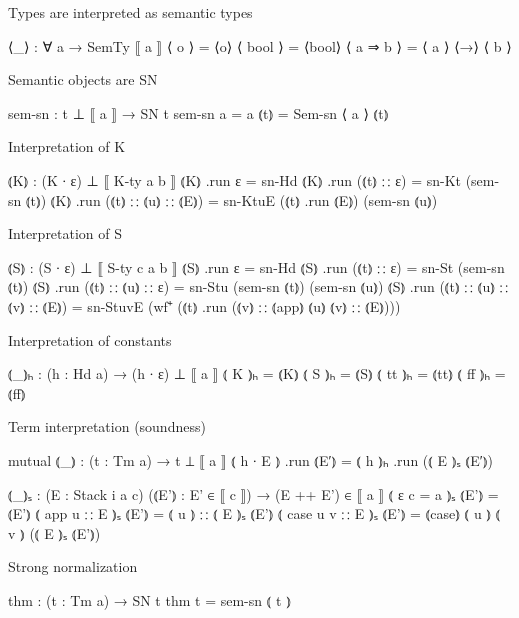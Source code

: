 Types are interpreted as semantic types

\begin{code}
⟨_⟩ : ∀ a → SemTy ⟦ a ⟧
⟨ o     ⟩  = ⟨o⟩
⟨ bool  ⟩  = ⟨bool⟩
⟨ a ⇒ b ⟩  = ⟨ a ⟩ ⟨→⟩ ⟨ b ⟩
\end{code}

Semantic objects are SN

\begin{code}
sem-sn : t ⊥ ⟦ a ⟧ → SN t
sem-sn {a = a} ⦅t⦆ = Sem-sn ⟨ a ⟩ ⦅t⦆
\end{code}


Interpretation of K

\begin{code}
⦅K⦆ : (K ∙ ε) ⊥ ⟦ K-ty a b ⟧
⦅K⦆ .run ε                  = sn-Hd
⦅K⦆ .run (⦅t⦆ ∷ ε)          = sn-Kt (sem-sn ⦅t⦆)
⦅K⦆ .run (⦅t⦆ ∷ ⦅u⦆ ∷ ⦅E⦆)  = sn-KtuE (⦅t⦆ .run ⦅E⦆) (sem-sn ⦅u⦆)
\end{code}


Interpretation of S

\begin{code}
⦅S⦆ : (S ∙ ε) ⊥ ⟦ S-ty c a b ⟧
⦅S⦆ .run ε                        = sn-Hd
⦅S⦆ .run (⦅t⦆ ∷ ε)                = sn-St (sem-sn ⦅t⦆)
⦅S⦆ .run (⦅t⦆ ∷ ⦅u⦆ ∷ ε)          = sn-Stu (sem-sn ⦅t⦆) (sem-sn ⦅u⦆)
⦅S⦆ .run (⦅t⦆ ∷ ⦅u⦆ ∷ ⦅v⦆ ∷ ⦅E⦆)  = sn-StuvE (wf⁺ (⦅t⦆ .run (⦅v⦆ ∷ ⦅app⦆ ⦅u⦆ ⦅v⦆ ∷ ⦅E⦆)))
\end{code}


Interpretation of constants

\begin{code}
⦅_⦆ₕ : (h : Hd a) → (h ∙ ε) ⊥ ⟦ a ⟧
⦅ K ⦆ₕ   = ⦅K⦆
⦅ S ⦆ₕ   = ⦅S⦆
⦅ tt ⦆ₕ  = ⦅tt⦆
⦅ ff ⦆ₕ  = ⦅ff⦆
\end{code}

Term interpretation (soundness)

\begin{code}
mutual
  ⦅_⦆ : (t : Tm a) → t ⊥ ⟦ a ⟧
  ⦅ h ∙ E ⦆ .run ⦅E′⦆ = ⦅ h ⦆ₕ .run (⦅ E ⦆ₛ ⦅E′⦆)

  ⦅_⦆ₛ : (E : Stack i a c) (⦅E'⦆ : E' ∈ ⟦ c ⟧) → (E ++ E') ∈ ⟦ a ⟧
  ⦅ ε {c = a}    ⦆ₛ  ⦅E'⦆ = ⦅E'⦆
  ⦅ app u ∷ E    ⦆ₛ  ⦅E'⦆ = ⦅ u ⦆ ∷ ⦅ E ⦆ₛ ⦅E'⦆
  ⦅ case u v ∷ E ⦆ₛ  ⦅E'⦆ = ⦅case⦆ ⦅ u ⦆ ⦅ v ⦆ (⦅ E ⦆ₛ ⦅E'⦆)
\end{code}

Strong normalization

\begin{code}
thm : (t : Tm a) → SN t
thm t = sem-sn ⦅ t ⦆
\end{code}


